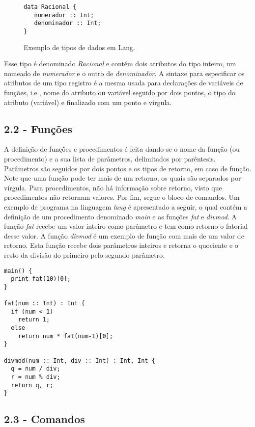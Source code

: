 \documentclass[a4paper,11pt]{article}
\begin{document}
\begin{figure}[H]
\begin{verbatim}
data Racional {
   numerador :: Int;
   denominador :: Int;
}
\end{verbatim}
\caption{Exemplo de tipos de dados em Lang.}
\end{figure}

Esse tipo é denominado \emph{Racional} e contém dois atributos do tipo inteiro, um nomeado
de \emph{numerador} e o outro de \emph{denominador}. A sintaxe para especificar os atributos de um
tipo registro é a mesma usada para declarações de variáveis de funções, i.e., nome do
atributo ou variável seguido por dois pontos, o tipo do atributo (variável) e finalizado
com um ponto e vírgula.
\subsection*{2.2 - Funções}
\label{sec:org442a28c}

A definição de funções e procedimentos é feita dando-se o nome da função (ou procedimento)
e a sua lista de parâmetros, delimitados por parêntesis. Parâmetros são seguidos por dois
pontos e os tipos de retorno, em caso de função. Note que uma função pode ter mais de um retorno,
os quais são separados por vírgula. Para procedimentos, não há informação sobre retorno, visto
que procedimentos não retornam valores. Por fim, segue o bloco de comandos. Um exemplo de programa
na linguagem \emph{lang} é apresentado a seguir, o qual contém a definição de um
procedimento denominado \emph{main} e as funções \emph{fat} e \emph{divmod}.
A função \emph{fat} recebe um valor inteiro como parâmetro e tem como retorno o fatorial desse valor.
A função \emph{divmod} é um exemplo de função com mais de um valor de retorno.
Esta função recebe dois parâmetros inteiros e retorna o quociente e o resto da divisão do primeiro
pelo segundo parâmetro.

\begin{verbatim}
main() {
  print fat(10)[0];
}

fat(num :: Int) : Int {
  if (num < 1)
    return 1;
  else
    return num * fat(num-1)[0];
}

divmod(num :: Int, div :: Int) : Int, Int {
  q = num / div;
  r = num % div;
  return q, r;
}
\end{verbatim}
\subsection*{2.3 - Comandos}
\label{sec:orgee8d526}
\end{document}

